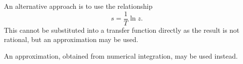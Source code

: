An alternative approach is to use the relationship \[ s  = \frac{1}{T}
\ln z. \] This cannot be substituted into a transfer function directly
as the result is not rational, but an approximation may be used.

An approximation, obtained from numerical integration, may be
used instead.
\endinput
